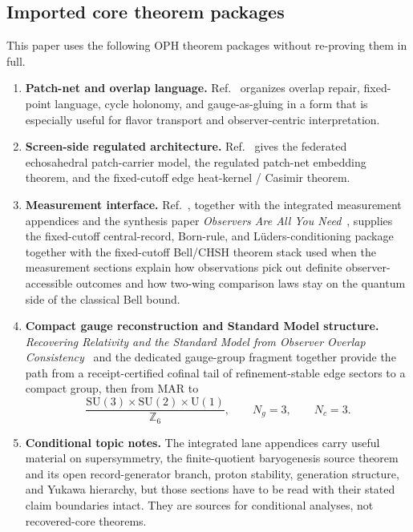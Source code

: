\documentclass[11pt]{article}
\newcommand{\SU}{\mathrm{SU}}
\newcommand{\U}{\mathrm{U}}
\begin{document}
\subsection{Imported core theorem packages}

This paper uses the following OPH theorem packages without re-proving them in full.

\begin{enumerate}[leftmargin=2em]
\item \textbf{Patch-net and overlap language.} Ref.~\cite{ophconsensus} organizes overlap repair,
fixed-point language, cycle holonomy, and gauge-as-gluing in a form that is especially useful
for flavor transport and observer-centric interpretation.
\item \textbf{Screen-side regulated architecture.} Ref.~\cite{ophmicrophysics} gives the
federated echosahedral patch-carrier model, the regulated patch-net embedding theorem, and the
fixed-cutoff edge heat-kernel / Casimir theorem.
\item \textbf{Measurement interface.} Ref.~\cite{ophmicrophysics}, together with the integrated
measurement appendices and the synthesis paper \emph{Observers Are All You Need}~\cite{ophsynthesis}, supplies the fixed-cutoff central-record, Born-rule, and
L\"uders-conditioning package together with the fixed-cutoff Bell/CHSH theorem stack used when
the measurement sections explain how observations pick out definite observer-accessible outcomes and how
two-wing comparison laws stay on the quantum side of the classical Bell bound.
\item \textbf{Compact gauge reconstruction and Standard Model structure.}
\emph{Recovering Relativity and the Standard Model from Observer Overlap Consistency}~\cite{ophcompact}
and the dedicated gauge-group fragment together provide the path from a receipt-certified cofinal
tail of refinement-stable edge sectors to a compact group, then from MAR to
\[
\frac{\SU(3)\times\SU(2)\times\U(1)}{\mathbb Z_6},
\qquad
N_g=3,
\qquad
N_c=3.
\]
\item \textbf{Conditional topic notes.} The integrated lane appendices carry useful material
on supersymmetry, the finite-quotient baryogenesis source theorem and its open record-generator branch, proton stability, generation structure, and Yukawa hierarchy,
but those sections have to be read with their stated claim boundaries intact. They are sources
for conditional analyses, not recovered-core theorems.
\end{enumerate}
\end{document}

